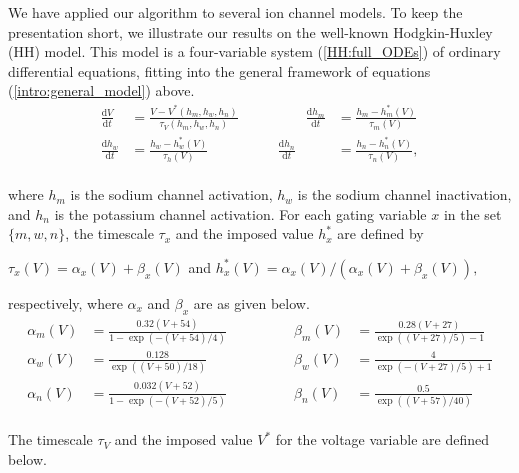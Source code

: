 \documentclass{llncs}
\newcommand{\D}[2]{ \ensuremath{ \frac{\mathrm{d} #1 }{\mathrm{d} #2 } }}
\begin{document}


We have applied our algorithm to several ion channel models. To keep the
presentation short, we illustrate our results on the well-known Hodgkin-Huxley (HH)
model. This model is a four-variable system (\ref{HH:full_ODEs}) of ordinary
differential equations, fitting into the general framework of equations
(\ref{intro:general_model}) above.
    \vspace{5pt}
    \begin{equation}\label{HH:full_ODEs}
      \begin{aligned} \D{V}{t}&=\frac{V-V^*(h_m,h_w,h_n)}{\tau_V(h_m,h_w,h_n)}
      \qquad&\qquad   \D{h_m}{t}&=\frac{h_m-h_m^*(V)}{\tau_{m}(V)}
      \\[10pt]         \D{h_w}{t}&=\frac{h_w-h_w^*(V)}{\tau_{h}(V)}
      &               \D{h_n}{t}&=\frac{h_n-h_n^*(V)}{\tau_{n}(V)},
      \end{aligned}
    \end{equation}
    \\[5pt]
 {where $h_m$ is the sodium channel activation, $h_w$ is the sodium channel inactivation, and
$h_n$ is the potassium channel activation.}
    For each gating variable $x$ in the set $\{m,w,n\}$, the timescale $\tau_x$
    and the imposed value $h_x^*$ are defined by
    \begin{center}
        \hfill $\tau_x(V)=\alpha_x(V)+\beta_x(V)$
        \hfill and
        \hfill $h_x^*(V)=\alpha_x(V)/(\alpha_x(V)+\beta_x(V)),$
        \hfill
    \end{center}
    respectively, where $\alpha_x$ and $\beta_x$ are as given below.
    \vspace{5pt}
    \begin{align*}      \alpha_m (V) &= \frac{0.32(V+54)}{1-\exp(-(V+54)/4)}
        \qquad&\qquad   \beta_m  (V) &= \frac{0.28(V+27)}{\exp((V+27)/5)-1}
        \\[10pt]        { \alpha_w }(V) &= \frac{0.128}{\exp((V+50)/18)}
        \qquad&\qquad   { \beta_w } (V) &= \frac{4}{\exp(-(V+27)/5)+1}
        \\[10pt]        \alpha_n (V) &= \frac{0.032(V+52)}{1-\exp(-(V+52)/5)}
        \qquad&\qquad   \beta_n  (V) &= \frac{0.5}{\exp((V+57)/40)}
    \end{align*}
    \\[5pt]
    The timescale $\tau_V$ and the imposed value $V^*$ for the voltage variable
    are defined below.
    \vspace{0pt}
\end{document}
